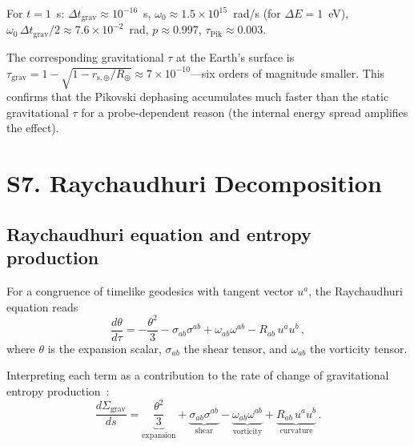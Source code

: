 \documentclass[aps,prd,preprint,superscriptaddress,longbibliography]{revtex4-2}
\newcommand{\tauasym}{\tau}
\newcommand{\Sgrav}{\Sigma_{\mathrm{grav}}}
\begin{document}
For $t = 1$~s: $\Delta t_{\mathrm{grav}} \approx 10^{-16}$~s,
$\omega_0 \approx 1.5\times10^{15}$~rad/s (for $\Delta E = 1$~eV),
$\omega_0\,\Delta t_{\mathrm{grav}}/2 \approx 7.6\times10^{-2}$~rad,
$p \approx 0.997$, $\tauasym_{\mathrm{Pik}} \approx 0.003$.

The corresponding gravitational $\tauasym$ at the Earth's surface is
$\tauasym_{\mathrm{grav}} = 1 - \sqrt{1-r_{\mathrm{s},\oplus}/R_\oplus}
\approx 7\times10^{-10}$---six orders of magnitude smaller.  This
confirms that the Pikovski dephasing accumulates much faster than the
static gravitational $\tauasym$ for a probe-dependent reason (the
internal energy spread amplifies the effect).

\section{S7. Raychaudhuri Decomposition}
\label{sec:raychaudhuri}

\subsection{Raychaudhuri equation and entropy production}

For a congruence of timelike geodesics with tangent vector $u^a$,
the Raychaudhuri equation reads~\cite{Raychaudhuri1955,Wald1984}
\begin{equation}
  \frac{d\theta}{d\tau} = -\frac{\theta^2}{3} - \sigma_{ab}\sigma^{ab}
  + \omega_{ab}\omega^{ab} - R_{ab}\,u^a u^b\,,
  \label{eq:Raychaudhuri}
\end{equation}
where $\theta$ is the expansion scalar, $\sigma_{ab}$ the shear
tensor, and $\omega_{ab}$ the vorticity tensor.

Interpreting each term as a contribution to the rate of change of
gravitational entropy production~\cite{Paper2}:
\begin{equation}
  \frac{d\Sgrav}{ds} = \underbrace{\frac{\theta^2}{3}}_{\text{expansion}}
  + \underbrace{\sigma_{ab}\sigma^{ab}}_{\text{shear}}
  - \underbrace{\omega_{ab}\omega^{ab}}_{\text{vorticity}}
  + \underbrace{R_{ab}\,u^a u^b}_{\text{curvature}}\,.
  \label{eq:dSigma_ds}
\end{equation}
\end{document}
